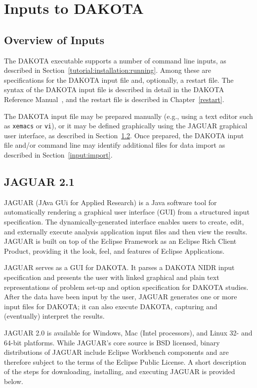 \chapter{Inputs to DAKOTA}\label{input}

\section{Overview of Inputs}\label{input:overview}

The DAKOTA executable supports a number of command line inputs, as
described in Section~\ref{tutorial:installation:running}.  Among
these are specifications for the DAKOTA input file and, optionally, a
restart file.  The syntax of the DAKOTA input file is described in detail 
in the DAKOTA Reference Manual~\cite{RefMan}, and the restart file is
described in Chapter~\ref{restart}.

The DAKOTA input file may be prepared manually (e.g., using a text
editor such as \texttt{xemacs} or \texttt{vi}), or it may be defined
graphically using the JAGUAR graphical user interface, as described in
Section~\ref{input:gui}.  Once prepared, the DAKOTA input file and/or
command line may identify additional files for data import as
described in Section~\ref{input:import}.

\section{JAGUAR 2.1}\label{input:gui}

JAGUAR (JAva GUi for Applied Research) is a Java software tool for
automatically rendering a graphical user interface (GUI) from a
structured input specification.  The dynamically-generated interface
enables users to create, edit, and externally execute analysis
application input files and then view the results.  JAGUAR is built on
top of the Eclipse Framework \cite{Eclipse} as an Eclipse Rich
Client Product, providing it the look, feel, and features of Eclipse
Applications.

JAGUAR serves as a GUI for DAKOTA.  It parses a DAKOTA NIDR input
specification and presents the user with linked graphical and plain
text representations of problem set-up and option specification for
DAKOTA studies. After the data have been input by the user, JAGUAR
generates one or more input files for DAKOTA; it can also execute
DAKOTA, capturing and (eventually) interpret the results.

JAGUAR 2.0 is available for Windows, Mac (Intel processors), and Linux
32- and 64-bit platforms.  While JAGUAR's core source is BSD licensed,
binary distributions of JAGUAR include Eclipse Workbench components
and are therefore subject to the terms of the Eclipse Public License.
A short description of the steps for downloading, installing, and
executing JAGUAR is provided below.

